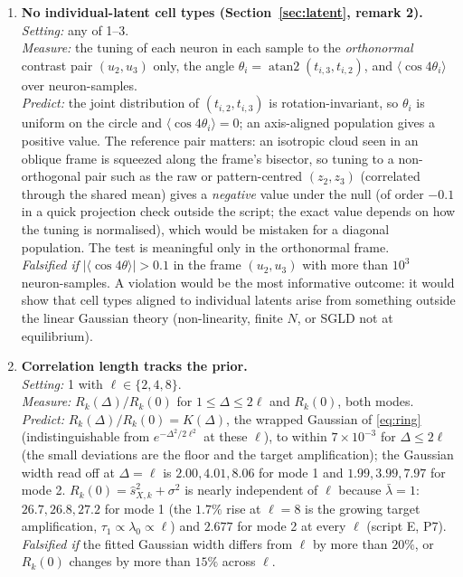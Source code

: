 \documentclass[11pt,a4paper]{article}
\theoremstyle{remark}
\begin{document}
\begin{enumerate}[leftmargin=2em,itemsep=4pt]
  \item \textbf{No individual-latent cell types (Section~\ref{sec:latent}, remark 2).}\\
  \emph{Setting:} any of 1--3.\\
  \emph{Measure:} the tuning of each neuron in each sample to the \emph{orthonormal} contrast pair $(u_2, u_3)$ only, the angle $\theta_i = \operatorname{atan2}(t_{i,3}, t_{i,2})$, and $\langle\cos4\theta_i\rangle$ over neuron-samples.\\
  \emph{Predict:} the joint distribution of $(t_{i,2}, t_{i,3})$ is rotation-invariant, so $\theta_i$ is uniform on the circle and $\langle\cos4\theta_i\rangle = 0$; an axis-aligned population gives a positive value. The reference pair matters: an isotropic cloud seen in an oblique frame is squeezed along the frame's bisector, so tuning to a non-orthogonal pair such as the raw or pattern-centred $(z_2, z_3)$ (correlated through the shared mean) gives a \emph{negative} value under the null (of order $-0.1$ in a quick projection check outside the script; the exact value depends on how the tuning is normalised), which would be mistaken for a diagonal population. The test is meaningful only in the orthonormal frame.\\
  \emph{Falsified if} $|\langle\cos4\theta\rangle|>0.1$ in the frame $(u_2, u_3)$ with more than $10^3$ neuron-samples. A violation would be the most informative outcome: it would show that cell types aligned to individual latents arise from something outside the linear Gaussian theory (non-linearity, finite $N$, or SGLD not at equilibrium).

  \item \textbf{Correlation length tracks the prior.}\\
  \emph{Setting:} 1 with $\ell\in\{2,4,8\}$.\\
  \emph{Measure:} $R_k(\Delta)/R_k(0)$ for $1\le \Delta\le2\ell$ and $R_k(0)$, both modes.\\
  \emph{Predict:} $R_k(\Delta)/R_k(0) = K(\Delta)$, the wrapped Gaussian of \eqref{eq:ring} (indistinguishable from $e^{-\Delta^2/2\ell^2}$ at these $\ell$), to within $7\times10^{-3}$ for $\Delta\le2\ell$ (the small deviations are the floor and the target amplification); the Gaussian width read off at $\Delta = \ell$ is $2.00, 4.01, 8.06$ for mode 1 and $1.99, 3.99, 7.97$ for mode 2. $R_k(0) = \hat s_{X,k}^2 + \sigma^2$ is nearly independent of $\ell$ because $\bar\lambda = 1$: $26.7, 26.8, 27.2$ for mode 1 (the $1.7\%$ rise at $\ell = 8$ is the growing target amplification, $\tau_1\propto\lambda_0\propto\ell$) and $2.677$ for mode 2 at every $\ell$ (script E, P7).\\
  \emph{Falsified if} the fitted Gaussian width differs from $\ell$ by more than $20\%$, or $R_k(0)$ changes by more than $15\%$ across $\ell$.


\end{enumerate}
\end{document}
